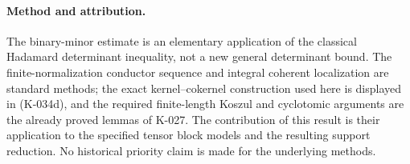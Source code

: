 \paragraph{Method and attribution.}
The binary-minor estimate is an elementary application of the
classical Hadamard determinant inequality, not a new general
determinant bound.  The finite-normalization conductor sequence
and integral coherent localization are standard methods; the
exact kernel--cokernel construction used here is displayed in
(K-034d), and the required finite-length Koszul and cyclotomic
arguments are the already proved lemmas of K-027.  The contribution
of this result is their application to the specified tensor block
models and the resulting support reduction.  No historical
priority claim is made for the underlying methods.
